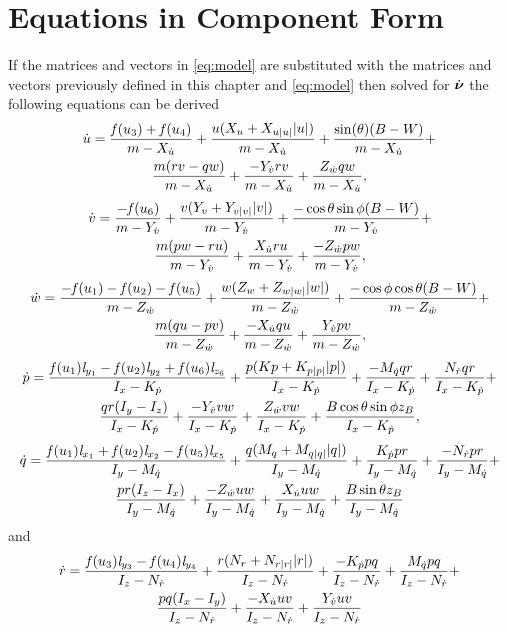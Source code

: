 \section{Equations in Component Form}
If the matrices and vectors in \eqref{eq:model} are substituted with the matrices and vectors previously defined in this chapter and \eqref{eq:model} then solved for $\dot{\boldsymbol{\nu}}$ the following equations can be derived 
\begin{multline} \label{eq:u_dot}
\dot{u} = \frac{\mathit{f}(u_{3}) + \mathit{f}(u_{4})}{m -X_{\dot{u}}} + \frac{u (X_{u} + X_{u|u|} |u|)}{m -X_{\dot{u}}} + \frac{\sin(\theta)(B - W)}{m -X_{\dot{u}}} +\\
\frac{m(r v - q w )}{m -X_{\dot{u}}} + \frac{-Y_{\dot{v}} r v}{m -X_{\dot{u}}} + \frac{Z_{\dot{w}} q w}{m -X_{\dot{u}}},
\end{multline}
\begin{multline} \label{eq:v_dot}
\dot{v} = \frac{-\mathit{f}(u_{6})}{m - Y_{\dot{v}}} + \frac{v (Y_{v} + Y_{v|v|} |v|)}{m - Y_{\dot{v}}} + \frac{-\cos{\theta} \sin{\phi}(B - W)}{m - Y_{\dot{v}}} +\\ \frac{m(p w - r u)}{m - Y_{\dot{v}}} + \frac{X_{\dot{u}} r u}{m - Y_{\dot{v}}} + \frac{-Z_{\dot{w}} p w}{m - Y_{\dot{v}}},
\end{multline}
\begin{multline} \label{eq:w_dot}
\dot{w} = \frac{-\mathit{f}(u_{1}) - \mathit{f}(u_{2}) - \mathit{f}(u_{5})}{m - Z_{\dot{w}}} + \frac{w (Z_{w} + Z_{w|w|} |w|)}{m - Z_{\dot{w}}} + \frac{-\cos{\phi}\cos{\theta}(B - W)}{m - Z_{\dot{w}}} +\\
\frac{m (q u - p v)}{m - Z_{\dot{w}}} + \frac{-X_{\dot{u}} q u}{m - Z_{\dot{w}}} + \frac{Y_{\dot{v}} p v}{m - Z_{\dot{w}}},
\end{multline}
\begin{multline} \label{eq:p_dot}
\dot{p} = \frac{\mathit{f}(u_{1}) \mathit{l}_{y_{1}} - \mathit{f}(u_{2}) \mathit{l}_{y_{2}} + \mathit{f}(u_{6}) \mathit{l}_{z_{6}}}{I_{x} - K_{\dot{p}}} + \frac{p (Kp + K_{p|p|} |p|)}{I_{x} - K_{\dot{p}}} + \frac{-M_{\dot{q}} q r}{I_{x} - K_{\dot{p}}} + \frac{N_{\dot{r}} q r}{I_{x} - K_{\dot{p}}} +\\
\frac{q r (I_{y} - I_{z})}{I_{x} - K_{\dot{p}}} + \frac{- Y_{\dot{v}} v w}{I_{x} - K_{\dot{p}}} + \frac{Z_{\dot{w}} v w}{I_{x} - K_{\dot{p}}} + \frac{B \cos{\theta} \sin{\phi} z_B}{I_{x} - K_{\dot{p}}},
\end{multline}
\begin{multline} \label{eq:q_dot}
\dot{q} =\frac{\mathit{f}(u_{1}) \mathit{l}_{x_{1}} + \mathit{f}(u_{2}) \mathit{l}_{x_{2}} - \mathit{f}(u_{5}) \mathit{l}_{x_{5}}}{I_{y} - M_{\dot{q}}} + \frac{q (M_{q} + M_{q|q|} |q|)}{I_{y} - M_{\dot{q}}} + \frac{K_{\dot{p}} p r}{I_{y} - M_{\dot{q}}} + \frac{-N_{\dot{r}} p r}{I_{y} - M_{\dot{q}}} +\\
\frac{p r (I_{z} - I_{x})}{I_{y} - M_{\dot{q}}} + \frac{-Z_{\dot{w}} u w}{I_{y} - M_{\dot{q}}} + \frac{X_{\dot{u}} u w}{I_{y} - M_{\dot{q}}} + \frac{B \sin{\theta} z_B}{I_{y} - M_{\dot{q}}} 
\end{multline} and 
\begin{multline} \label{eq:r_dot}
\dot{r} = \frac{\mathit{f}(u_{3}) \mathit{l}_{y_{3}} - \mathit{f}(u_{4}) \mathit{l}_{y_{4}}}{I_{z} - N_{\dot{r}}} + \frac{r (N_{r} + N_{r|r|} |r|)}{I_{z} - N_{\dot{r}}} + \frac{-K_{\dot{p}} p q}{I_{z} - N_{\dot{r}}} + \frac{M_{\dot{q}} p q}{I_{z} - N_{\dot{r}}} +\\
\frac{p q (I_{x} - I_{y})}{I_{z} - N_{\dot{r}}} + \frac{- X_{\dot{u}} u v}{I_{z} - N_{\dot{r}}} + \frac{Y_{\dot{v}} u v}{I_{z} - N_{\dot{r}}}
\end{multline} 